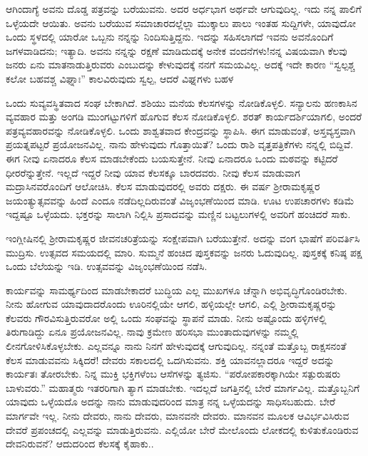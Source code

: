 ಆಗಿಂದಾಗ್ಯೆ\enginline{-} ಅವನು ದೊಡ್ಡ ಪತ್ರವನ್ನು ಬರೆಯುವನು. ಅದರ ಅರ್ಧಭಾಗ ಅರ್ಥವೇ ಆಗುವುದಿಲ್ಲ. ಇದು ನನ್ನ ಪಾಲಿಗೆ ಒಳ್ಳೆಯದೇ ಆಯಿತು. ಅವನು ಬರೆಯುವ ಸಮಾಚಾರದಲ್ಲೆಲ್ಲಾ ಮುಕ್ಕಾಲು ಪಾಲು ಇಂತಹ ಸುದ್ದಿಗಳೇ, ಯಾವುದೋ ಒಂದು ಸ್ಥಳದಲ್ಲಿ ಯಾರೋ ಒಬ್ಬನು ನನ್ನನ್ನು ನಿಂದಿಸುತ್ತಿದ್ದನು. ಇದನ್ನು ಸಹಿಸಲಾಗದೆ ಇವನು ಅವನೊಂದಿಗೆ ಜಗಳವಾಡಿದನು; ಇತ್ಯಾದಿ. ಅವನು ನನ್ನನ್ನು ರಕ್ಷಣೆ ಮಾಡಿದುದಕ್ಕೆ ಅನೇಕ ವಂದನೆಗಳು!ನನ್ನ ವಿಷಯವಾಗಿ ಕೆಲವು ಜನರು ಏನು ಮಾತನಾಡುತ್ತಿರುವರು ಎಂಬುದನ್ನು ಕೇಳುವುದಕ್ಕೆ ನನಗೆ ಸಮಯವಿಲ್ಲ. ಅದಕ್ಕೆ ಇದೇ ಕಾರಣ\enginline{-} “ಸ್ವಲ್ಪಶ್ಚ ಕಲೋ ಬಹವಶ್ಚ ವಿಘ್ನಾಃ” ಕಾಲವಿರುವುದು ಸ್ವಲ್ಪ, ಆದರೆ ವಿಘ್ನಗಳು ಬಹಳ
\vspace{0.3cm}

ಒಂದು ಸುವ್ಯವಸ್ಥಿತವಾದ ಸಂಘ ಬೇಕಾಗಿದೆ. ಶಶಿಯು ಮನೆಯ ಕೆಲಸಗಳನ್ನು ನೋಡಿಕೊಳ್ಳಲಿ. ಸನ್ಯಾಲನು ಹಣಕಾಸಿನ ವ್ಯವಹಾರ ಮತ್ತು ಅಂಗಡಿ ಮುಂಗಟ್ಟುಗಳಿಗೆ ಹೊಗುವ ಕೆಲಸ ನೋಡಿಕೊಳ್ಳಲಿ. ಶರತ್ ಕಾರ್ಯದರ್ಶಿಯಾಗಲಿ, ಅಂದರೆ ಪತ್ರವ್ಯವಹಾರವನ್ನು ನೋಡಿಕೊಳ್ಳಲಿ. ಒಂದು ಶಾಶ್ವತವಾದ ಕೇಂದ್ರವನ್ನು ಸ್ಥಾಪಿಸಿ. ಈಗ ಮಾಡುವಂತೆ, ಅಸ್ತವ್ಯಸ್ತವಾಗಿ ಪ್ರಯತ್ನಪಟ್ಟರೆ ಪ್ರಯೋಜನವಿಲ್ಲ. ನಾನು ಹೇಳುವುದು ಗೊತ್ತಾಯಿತೆ? ಒಂದು ರಾಶಿ ವೃತ್ತಪತ್ರಿಕೆಗಳು ನನ್ನಲ್ಲಿ ಬಿದ್ದಿವೆ. ಈಗ ನೀವು ಏನಾದರೂ ಕೆಲಸ ಮಾಡಬೇಕೆಂದು ಬಯಸುತ್ತೇನೆ. ನೀವು ಏನಾದರೂ ಒಂದು ಮಠವನ್ನು ಕಟ್ಟಿದರೆ ಧೀರರೆನ್ನುತ್ತೇನೆ. ಇಲ್ಲದೆ ಇದ್ದರೆ ನೀವು ಯಾವ ಕೆಲಸಕ್ಕೂ ಬಾರದವರು. ನೀವು ಕೆಲಸ ಮಾಡುವಾಗ ಮದ್ರಾಸಿನವರೊಂದಿಗೆ ಆಲೋಚಿಸಿ. ಕೆಲಸ ಮಾಡುವುದರಲ್ಲಿ ಅವರು ದಕ್ಷರು. ಈ ವರ್ಷ ಶ‍್ರೀರಾಮಕೃಷ್ಣರ ಜಯಂತ್ಯುತ್ಸವವನ್ನು ಹಿಂದೆ ಎಂದೂ ನಡೆದಿಲ್ಲದಿರುವಂತೆ ವಿಜೃಂಭಣೆಯಿಂದ ಮಾಡಿ. ಊಟ ಉಪಚಾರಗಳು ಕಡಿಮೆ ಇದ್ದಷ್ಟೂ ಒಳ್ಳೆಯದು. ಭಕ್ತರನ್ನು ಸಾಲಾಗಿ ನಿಲ್ಲಿಸಿ ಪ್ರಸಾದವನ್ನು ಮಣ್ಣಿನ ಬಟ್ಟಲುಗಳಲ್ಲಿ ಅವರಿಗೆ ಹಂಚಿದರೆ ಸಾಕು.

ಇಂಗ್ಲೀಷಿನಲ್ಲಿ ಶ‍್ರೀರಾಮಕೃಷ್ಣರ ಜೀವನಚರಿತ್ರೆಯನ್ನು ಸಂಕ್ಷೇಪವಾಗಿ ಬರೆಯುತ್ತೇನೆ. ಅದನ್ನು ವಂಗ ಭಾಷೆಗೆ ಪರಿವರ್ತಿಸಿ ಮುದ್ರಿಸು. ಉತ್ಸವದ ಸಮಯದಲ್ಲಿ ಮಾರಿ. ಸುಮ್ಮನೆ ಹಂಚಿದ ಪುಸ್ತಕವನ್ನು ಜನರು ಓದುವುದಿಲ್ಲ. ಪುಸ್ತಕಕ್ಕೆ ಕನಿಷ್ಠ ಪಕ್ಷ ಒಂದು ಬೆಲೆಯನ್ನು ಇಡಿ. ಉತ್ಸವವನ್ನು ವಿಜೃಂಭಣೆಯಿಂದ ನಡೆಸಿ.

ಕಾರ್ಯವನ್ನು ಸಾಮರ್ಥ್ಯದಿಂದ ಮಾಡಬೇಕಾದರೆ ಬುದ್ಧಿಯ ಎಲ್ಲ ಮುಖಗಳೂ ಚೆನ್ನಾಗಿ ಅಭಿವೃದ್ಧಿಗೊಂಡಿರಬೇಕು. ನೀನು ಹೋಗುವ ಯಾವುದಾದರೊಂದು ಊರಿನಲ್ಲಿಯೇ ಆಗಲಿ, ಹಳ್ಳಿಯಲ್ಲೇ ಆಗಲಿ, ಎಲ್ಲಿ ಶ‍್ರೀರಾಮಕೃಷ್ಣರನ್ನು ಕೆಲವರು ಗೌರವಿಸುತ್ತಿರುವರೋ ಅಲ್ಲಿ ಒಂದು ಸಂಘವನ್ನು ಸ್ಥಾಪನೆ ಮಾಡು. ನೀನು ಅಷ್ಟೊಂದು ಹಳ್ಳಿಗಳಲ್ಲಿ ತಿರುಗಾಡಿದ್ದು ಏನೂ ಪ್ರಯೋಜನವಿಲ್ಲ. ನಾವು ಕ್ರಮೇಣ ಹರಿಸಭಾ ಮುಂತಾದುವುಗಳನ್ನು ನಮ್ಮಲ್ಲಿ ಲೀನಗೋಳಿಸಿಕೊಳ್ಳಬೇಕು. ಎಲ್ಲವನ್ನೂ ನಾನು ನಿನಗೆ ಹೇಳುವುದಕ್ಕೆ ಆಗುವುದಿಲ್ಲ. ನನ್ನಂತೆ ಮತ್ತೊಬ್ಬ ರಾಕ್ಷಸನಂತೆ ಕೆಲಸ ಮಾಡುವವನು ಸಿಕ್ಕಿದರೆ! ದೇವರು ಸಕಾಲದಲ್ಲಿ ಒದಗಿಸುವನು. ಶಕ್ತಿ ಯಾವನಲ್ಲಾದರೂ ಇದ್ದರೆ ಅದನ್ನು ಕಾರ್ಯತಃ ತೋರಬೇಕು. ನಿನ್ನ ಮುಕ್ತಿ ಭಕ್ತಿಗಳೆಂಬ ಆಸೆಗಳನ್ನು ತ್ಯಜಿಸು. “ಪರೋಪಕಾರಕ್ಕಾಗಿಯೇ ಸತ್ಪುರುಷರು ಬಾಳುವರು.” ಮಹಾತ್ಮರು ಇತರರಿಗಾಗಿ ತ್ಯಾಗ ಮಾಡಬೇಕು. ಇದಲ್ಲದೆ ಜಗತ್ತಿನಲ್ಲಿ ಬೇರೆ ಮಾರ್ಗವಿಲ್ಲ. ಮತ್ತೊಬ್ಬನಿಗೆ ಯಾವುದು ಒಳ್ಳೆಯದೊ ಅದನ್ನು ನಾನು ಮಾಡುವುದರಿಂದ ಮಾತ್ರ ನನ್ನ ಒಳ್ಳೆಯದನ್ನು ಸಾಧಿಸಬಹುದು. ಬೇರೆ ಮಾರ್ಗವೇ ಇಲ್ಲ. ನೀನು ದೇವರು, ನಾನು ದೇವರು, ಮಾನವನೇ ದೇವರು. ಮಾನವನ ಮೂಲಕ ಆವಿರ್ಭವಿಸಿರುವ ದೇವರೆ ಪ್ರಪಂಚದಲ್ಲಿ ಎಲ್ಲವನ್ನು ಮಾಡುತ್ತಿರುವನು. ಎಲ್ಲಿಯೋ ಬೇರೆ ಮೇಲೊಂದು ಲೋಕದಲ್ಲಿ ಕುಳಿತುಕೊಂಡಿರುವ ದೇವನಿರುವನೆ? ಆದುದರಿಂದ ಕೆಲಸಕ್ಕೆ ಕೈಹಾಕು..

